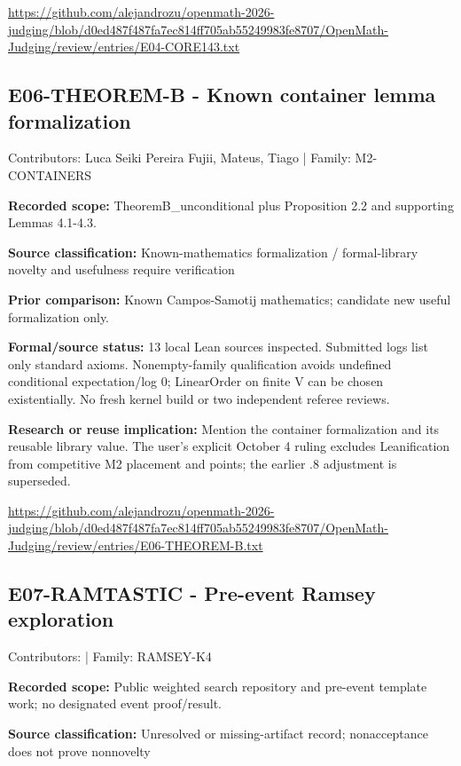 \documentclass[11pt,a4paper]{article}
\begin{document}
{\small \url{https://github.com/alejandrozu/openmath-2026-judging/blob/d0ed487f487fa7ec814ff705ab55249983fe8707/OpenMath-Judging/review/entries/E04-CORE143.txt}\par}

\begin{samepage}
\subsection{E06-THEOREM-B  -  Known container lemma formalization}
{\small Contributors: Luca Seiki Pereira Fujii, Mateus, Tiago | Family: M2-CONTAINERS\par}

\textbf{Recorded scope:} TheoremB\_unconditional plus Proposition 2.2 and supporting Lemmas 4.1-4.3.

\end{samepage}
\textbf{Source classification:} Known-mathematics formalization / formal-library novelty and usefulness require verification

\textbf{Prior comparison:} Known Campos-Samotij mathematics; candidate new useful formalization only.

\textbf{Formal/source status:} 13 local Lean sources inspected. Submitted logs list only standard axioms. Nonempty-family qualification avoids undefined conditional expectation/log 0; LinearOrder on finite V can be chosen existentially. No fresh kernel build or two independent referee reviews.

\textbf{Research or reuse implication:} Mention the container formalization and its reusable library value. The user's explicit October 4 ruling excludes Leanification from competitive M2 placement and points; the earlier .8 adjustment is superseded.

{\small \url{https://github.com/alejandrozu/openmath-2026-judging/blob/d0ed487f487fa7ec814ff705ab55249983fe8707/OpenMath-Judging/review/entries/E06-THEOREM-B.txt}\par}

\begin{samepage}
\subsection{E07-RAMTASTIC  -  Pre-event Ramsey exploration}
{\small Contributors:  | Family: RAMSEY-K4\par}

\textbf{Recorded scope:} Public weighted search repository and pre-event template work; no designated event proof/result.

\end{samepage}
\textbf{Source classification:} Unresolved or missing-artifact record; nonacceptance does not prove nonnovelty
\end{document}
